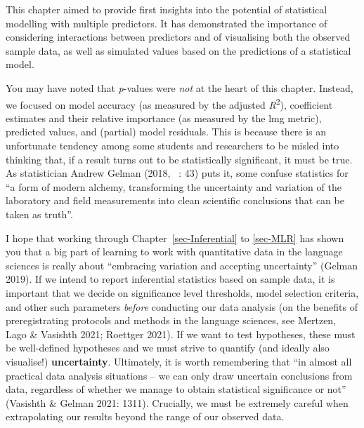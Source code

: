 \documentclass[
  letterpaper,
  DIV=11,
  numbers=noendperiod]{scrreprt}
\begin{document}
This chapter aimed to provide first insights into the potential of
statistical modelling with multiple predictors. It has demonstrated the
importance of considering interactions between predictors and of
visualising both the observed sample data, as well as simulated values
based on the predictions of a statistical model.

You may have noted that \emph{p}-values were \emph{not} at the heart of
this chapter. Instead, we focused on model accuracy (as measured by the
adjusted \emph{R}\textsuperscript{2}), coefficient estimates and their
relative importance (as measured by the lmg metric), predicted values,
and (partial) model residuals. This is because there is an unfortunate
tendency among some students and researchers to be misled into thinking
that, if a result turns out to be statistically significant, it must be
true. As statistician Andrew Gelman (2018, ~: 43) puts it, some confuse
statistics for ``a form of modern alchemy, transforming the uncertainty
and variation of the laboratory and field measurements into clean
scientific conclusions that can be taken as truth''.

I hope that working through Chapter~\ref{sec-Inferential} to
\ref{sec-MLR} has shown you that a big part of learning to work with
quantitative data in the language sciences is really about ``embracing
variation and accepting uncertainty'' (Gelman 2019). If we intend to
report inferential statistics based on sample data, it is important that
we decide on significance level thresholds, model selection criteria,
and other such parameters \emph{before} conducting our data analysis (on
the benefits of preregistrating protocols and methods in the language
sciences, see Mertzen, Lago \& Vasishth 2021; Roettger 2021). If we want
to test hypotheses, these must be well-defined hypotheses and we must
strive to quantify (and ideally also visualise!) \textbf{uncertainty}.
Ultimately, it is worth remembering that ``in almost all practical data
analysis situations -- we can only draw uncertain conclusions from data,
regardless of whether we manage to obtain statistical significance or
not'' (Vasishth \& Gelman 2021: 1311). Crucially, we must be extremely
careful when extrapolating our results beyond the range of our observed
data.
\end{document}
